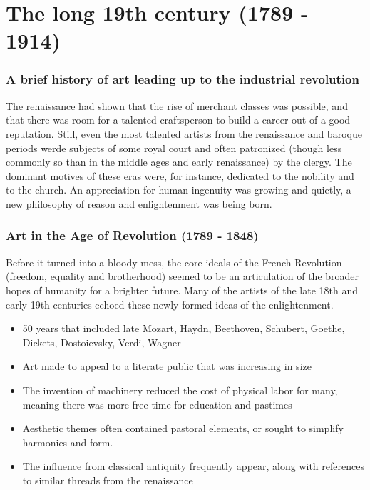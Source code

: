 \documentclass[11pt]{article}
\begin{document}
\section{The long 19th century (1789 - 1914)}
\label{sec:orgbd5b0d8}

\subsubsection{A brief history of art leading up to the industrial revolution}
\label{sec:org5b6c97f}
The renaissance had shown that the rise of merchant classes was
possible, and that there was room for a talented craftsperson to build
a career out of a good reputation. Still, even the most talented
artists from the renaissance and baroque periods werde subjects of
some royal court and often patronized (though less commonly so than in
the middle ages and early renaissance) by the clergy. The dominant
motives of these eras were, for instance, dedicated to the nobility
and to the church. An appreciation for human ingenuity was growing and
quietly, a new philosophy of reason and enlightenment was being born. 


\subsubsection{Art in the Age of Revolution (1789 - 1848)}
\label{sec:org0cb54d1}

Before it turned into a bloody mess, the core ideals of the French
Revolution (freedom, equality and brotherhood) seemed to be an
articulation of the broader hopes of humanity for a brighter future. 
Many of the artists of the late 18th and early 19th centuries echoed
these newly formed ideas of the enlightenment. 

\begin{itemize}
\item 50 years that included late Mozart, Haydn, Beethoven, Schubert, Goethe, Dickets,
Dostoievsky, Verdi, Wagner
\item Art made to appeal to a literate public that was increasing in
size
\item The invention of machinery reduced the cost of physical labor for
many, meaning there was more free time for education and pastimes
\item Aesthetic themes often contained pastoral elements, or sought to
simplify harmonies and form.
\item The influence from classical antiquity frequently appear, along with
references to similar threads from the renaissance
\end{itemize}
\end{document}
